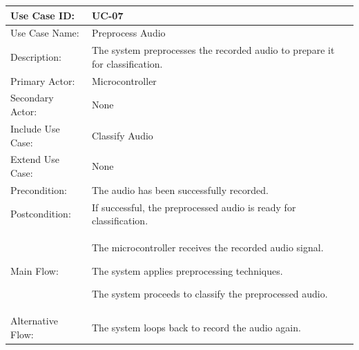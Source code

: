 \begin{thesisprose}
\FloatBarrier
\begingroup
\small
\setlength{\tabcolsep}{3pt}
\renewcommand{\arraystretch}{1.14}
\setlength{\arrayrulewidth}{0.625pt}
\def\LTcaptype{uncaptionedgrid}
\begin{longtable}{|>{\raggedright\arraybackslash}p{}|>{\raggedright\arraybackslash}p{}|}
\hline
Use Case ID: & UC-07 \\
\hline
Use Case Name: & Preprocess Audio \\
\hline
Description: & The system preprocesses the recorded audio to prepare it for classification. \\
\hline
Primary Actor: & Microcontroller \\
\hline
Secondary Actor: & None \\
\hline
Include Use Case: & Classify Audio \\
\hline
Extend Use Case: & None \\
\hline
Precondition: & The audio has been successfully recorded. \\
\hline
Postcondition: & If successful, the preprocessed audio is ready for classification. \\
\hline
Main Flow: & The microcontroller receives the recorded audio signal.\par The system applies preprocessing techniques.\par The system proceeds to classify the preprocessed audio. \\
\hline
Alternative Flow: & The system loops back to record the audio again. \\
\hline
\end{longtable}
\endgroup


\end{thesisprose}
